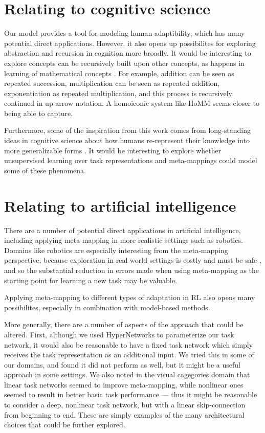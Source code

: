 \section{Relating to cognitive science}

Our model provides a tool for modeling human adaptibility, which has many potential direct applications. However, it also opens up possibilites for exploring abstraction and recursion in cognition more broadly. It would be interesting to explore concepts can be recursively built upon other concepts, as happens in learning of mathematical concepts \citep{Wilensky1991, Hazzan1999, Lampinen2017b}. For example, addition can be seen as repeated succession, multiplication can be seen as repeated addition, exponentiation as repeated multiplication, and this process is recursively continued in up-arrow notation. A homoiconic system like HoMM seems closer to being able to capture. \par 

Furthermore, some of the inspiration from this work comes from long-standing ideas in cognitive science about how humans re-represent their knowledge into more generalizable forms \citep{Karmiloff-Smith1986,Clark1993}. It would be interesting to explore whether unsupervised learning over task representations and meta-mappings could model some of these phenomena.\par 

\section{Relating to artificial intelligence}

There are a number of potential direct applications in artificial intelligence, including applying meta-mapping in more realistic settings such as robotics. Domains like robotics are especially interesting from the meta-mapping perspective, because exploration in real world settings is costly and must be safe \citep{Turchetta2016}, and so the substantial reduction in errors made when using meta-mapping as the starting point for learning a new task may be valuable. \par 

Applying meta-mapping to different types of adaptation in RL also opens many possibilites, especially in combination with model-based methods. 

More generally, there are a number of aspects of the approach that could be altered. First, although we used HyperNetworks to parameterize our task network, it would also be reasonable to have a fixed task network which simply receives the task representation as an additional input. We tried this in some of our domains, and found it did not perform as well, but it might be a useful approach in some settings. We also noted in the visual cagegories domain that linear task networks seemed to improve meta-mapping, while nonlinear ones seemed to result in better basic task performance --- thus it might be reasonable to consider a deep, nonlinear task network, but with a linear skip-connection from beginning to end. These are simply examples of the many architectural choices that could be further explored.



